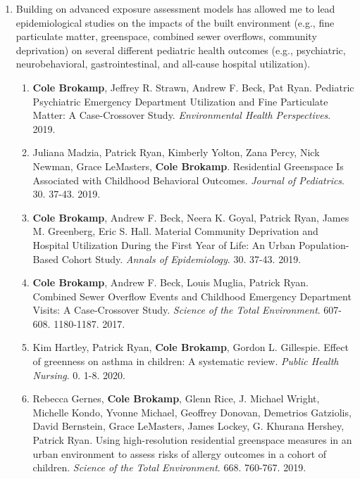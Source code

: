 \documentclass{nihbiosketch}
\begin{document}
\begin{enumerate}
\begin{enumerate}
\end{enumerate}

\item Building on advanced exposure assessment models has allowed me to lead epidemiological studies on the impacts of the built environment (e.g., fine particulate matter, greenspace, combined sewer overflows, community deprivation) on several different pediatric health outcomes (e.g., psychiatric, neurobehavioral, gastrointestinal, and all-cause hospital utilization).

  \begin{enumerate}

  \item \textbf{Cole Brokamp}, Jeffrey R. Strawn, Andrew F. Beck, Pat Ryan.
    Pediatric Psychiatric Emergency Department Utilization and Fine
    Particulate Matter: A Case-Crossover Study. \textit{Environmental Health
      Perspectives}. 2019.

  \item Juliana Madzia, Patrick Ryan, Kimberly Yolton, Zana Percy, Nick Newman, Grace
    LeMasters, \textbf{Cole Brokamp}. Residential Greenspace Is Associated with Childhood
    Behavioral Outcomes. \textit{Journal of Pediatrics}. 30. 37-43. 2019.

  \item \textbf{Cole Brokamp}, Andrew F. Beck, Neera K. Goyal, Patrick Ryan,
    James M. Greenberg, Eric S. Hall. Material Community Deprivation and
    Hospital Utilization During the First Year of Life: An Urban
    Population-Based Cohort Study. \textit{Annals of Epidemiology}. 30. 37-43.
    2019.

  \item \textbf{Cole Brokamp}, Andrew F. Beck, Louis Muglia, Patrick Ryan. Combined Sewer Overflow Events and Childhood Emergency Department Visits: A Case-Crossover Study. \textit{Science of the Total Environment}. 607-608. 1180-1187. 2017.
    
  \item Kim Hartley, Patrick Ryan, \textbf{Cole Brokamp}, Gordon L. Gillespie.
    Effect of greenness on asthma in children: A systematic review.
    \emph{Public Health Nursing}. 0. 1-8. 2020.

    \item Rebecca Gernes, \textbf{Cole Brokamp}, Glenn Rice, J. Michael Wright,
    Michelle Kondo, Yvonne Michael, Geoffrey Donovan, Demetrios Gatziolis,
    David Bernstein, Grace LeMasters, James Lockey, G. Khurana Hershey,
    Patrick Ryan. Using high-resolution residential greenspace measures in
    an urban environment to assess risks of allergy outcomes in a cohort of
    children. \emph{Science of the Total Environment}. 668. 760-767. 2019.


\end{enumerate}
\end{enumerate}
\end{document}
